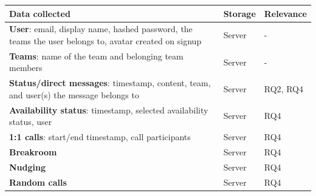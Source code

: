 \begin{table}[h]
    \centering
    \begin{tabular}{|p{8cm}|p{1cm}|p{2cm}|}
        \hline
        Data collected                                                                                                                                                     & Storage & Relevance \\
        \hline
        \textbf{User}: email, display name, hashed password, the teams the user belongs to, avatar created on signup                                                       & Server  & -         \\
        \hline

        \textbf{Teams}: name of the team and belonging team members                                                                                                        & Server  & -         \\
        \hline

        \textbf{Status/direct messages}: timestamp, content, team, and user(s) the message belongs to                                                                      & Server  & RQ2, RQ4  \\
        \hline
        \textbf{Availability status}: timestamp, selected availability status, user                                                                                        & Server  & RQ4       \\
        \hline
        \textbf{1:1 calls}: start/end timestamp, call participants                                                                                                         & Server  & RQ4       \\
        \hline
        \textbf{Breakroom}                                                                                                                                                 & Server  & RQ4       \\
        \hline
        \textbf{Nudging}                                                                                                                                                   & Server  & RQ4       \\
        \hline
        \textbf{Random calls}                                                                                                                                              & Server  & RQ4       \\


\end{tabular}
\end{table}
